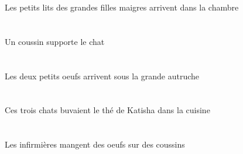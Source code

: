 \begin{exe}
Les petits lits des grandes filles maigres arrivent dans la chambre
\ex\glll
\INDSgErg{}   \coussinASgErg{}   \DEFSgAbs{}   \chatDSgAbs{}  \supporterVtPrsDSg{}\\
\INDSgErgP{}   \coussinASgErgP{}   \DEFSgAbsP{}   \chatDSgAbsP{}  \supporterVtPrsDSgP{}\\
\INDSgErgG{}   \coussinASgErgG{}   \DEFSgAbsG{}   \chatDSgAbsG{}  \supporterVtPrsDSgG{}\\
Un coussin supporte le chat
\ex\glll
\DEFDuAbs{}   \petitDDu{}   \oeufDDuAbs{}    \DEFSgObl{}   \grandDSg{}   \autrucheDSgObl{}   \SOUS{}  \arriverViPrsDDu{}\\
\DEFDuAbsP{}   \petitDDuP{}   \oeufDDuAbsP{}    \DEFSgOblP{}   \grandDSgP{}   \autrucheDSgOblP{}   \SOUSP{}  \arriverViPrsDDuP{}\\
\DEFDuAbsG{}   \petitDDuG{}   \oeufDDuAbsG{}    \DEFSgOblG{}   \grandDSgG{}   \autrucheDSgOblG{}   \SOUSG{}  \arriverViPrsDDuG{}\\
Les deux petits oeufs arrivent sous la grande autruche
\ex\glll
\DEFSgObl{}   \cuisineCSgObl{}   \DANS{}   \DEMPlErg{}   \troisDPl{}   \chatDPlErg{}   \DEFSgAbs{}    \INDSgObl{}   \KatishaASgObl{}   \DE{}   \theBSgAbs{}  \boireVtPstBSg{}\\
\DEFSgOblP{}   \cuisineCSgOblP{}   \DANSP{}   \DEMPlErgP{}   \troisDPlP{}   \chatDPlErgP{}   \DEFSgAbsP{}    \INDSgOblP{}   \KatishaASgOblP{}   \DEP{}   \theBSgAbsP{}  \boireVtPstBSgP{}\\
\DEFSgOblG{}   \cuisineCSgOblG{}   \DANSG{}   \DEMPlErgG{}   \troisDPlG{}   \chatDPlErgG{}   \DEFSgAbsG{}    \INDSgOblG{}   \KatishaASgOblG{}   \DEG{}   \theBSgAbsG{}  \boireVtPstBSgG{}\\
Ces trois chats buvaient le thé de Katisha dans la cuisine
\ex\glll
\INDPlObl{}   \coussinAPlObl{}   \SUR{}   \DEFPlErg{}   \infirmiereBPlErg{}   \INDPlAbs{}   \oeufDPlAbs{}  \mangerVtPrsDPl{}\\
\INDPlOblP{}   \coussinAPlOblP{}   \SURP{}   \DEFPlErgP{}   \infirmiereBPlErgP{}   \INDPlAbsP{}   \oeufDPlAbsP{}  \mangerVtPrsDPlP{}\\
\INDPlOblG{}   \coussinAPlOblG{}   \SURG{}   \DEFPlErgG{}   \infirmiereBPlErgG{}   \INDPlAbsG{}   \oeufDPlAbsG{}  \mangerVtPrsDPlG{}\\
Les infirmières mangent des oeufs sur des coussins
\ex\glll
\INDPlObl{}   \jauneCPl{}   \balaiCPlObl{}   \AVEC{}   \DEFPlErg{}   \troisCPl{}   \filleCPlErg{}   \DEMDuAbs{}    \DEFSgObl{}   \rougeDSg{}   \maisonDSgObl{}   \DEVANT{}   \coyoteADuAbs{}  \chasserVtPrsADu{}\\

\end{exe}
